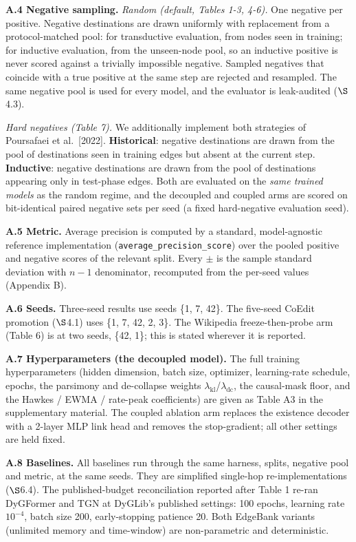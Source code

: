 \documentclass[conference]{IEEEtran}
\begin{document}
\textbf{A.4 Negative sampling.} \emph{Random (default, Tables 1-3, 4-6).} One negative per positive. Negative destinations are drawn uniformly with replacement from a protocol-matched pool: for transductive evaluation, from nodes seen in training; for inductive evaluation, from the unseen-node pool, so an inductive positive is never scored against a trivially impossible negative. Sampled negatives that coincide with a true positive at the same step are rejected and resampled. The same negative pool is used for every model, and the evaluator is leak-audited ($\S$4.3).

\emph{Hard negatives (Table 7).} We additionally implement both strategies of Poursafaei et al.~[2022]. \textbf{Historical}: negative destinations are drawn from the pool of destinations seen in training edges but absent at the current step. \textbf{Inductive}: negative destinations are drawn from the pool of destinations appearing only in test-phase edges. Both are evaluated on the \emph{same trained models} as the random regime, and the decoupled and coupled arms are scored on bit-identical paired negative sets per seed (a fixed hard-negative evaluation seed).

\textbf{A.5 Metric.} Average precision is computed by a standard, model-agnostic reference implementation (\texttt{average\_precision\_score}) over the pooled positive and negative scores of the relevant split. Every $\pm$ is the sample standard deviation with $n-1$ denominator, recomputed from the per-seed values (Appendix B).

\textbf{A.6 Seeds.} Three-seed results use seeds \{1, 7, 42\}. The five-seed CoEdit promotion ($\S$4.1) uses \{1, 7, 42, 2, 3\}. The Wikipedia freeze-then-probe arm (Table 6) is at two seeds, \{42, 1\}; this is stated wherever it is reported.

\textbf{A.7 Hyperparameters (the decoupled model).} The full training hyperparameters (hidden dimension, batch size, optimizer, learning-rate schedule, epochs, the parsimony and de-collapse weights $\lambda_{\text{kl}}$/$\lambda_{\text{dc}}$, the causal-mask floor, and the Hawkes / EWMA / rate-peak coefficients) are given as Table A3 in the supplementary material. The coupled ablation arm replaces the existence decoder with a 2-layer MLP link head and removes the stop-gradient; all other settings are held fixed.

\textbf{A.8 Baselines.} All baselines run through the same harness, splits, negative pool and metric, at the same seeds. They are simplified single-hop re-implementations ($\S$6.4). The published-budget reconciliation reported after Table 1 re-ran DyGFormer and TGN at DyGLib's published settings: 100 epochs, learning rate \(10^{-4}\), batch size 200, early-stopping patience 20. Both EdgeBank variants (unlimited memory and time-window) are non-parametric and deterministic.
\end{document}
